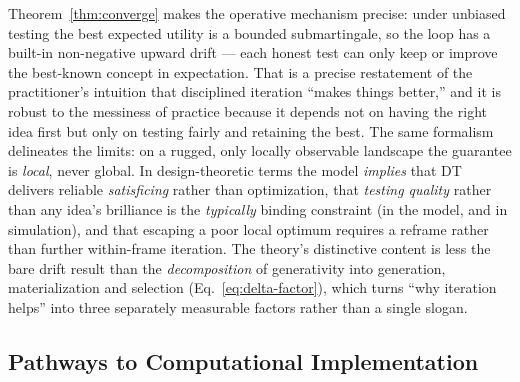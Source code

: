 \documentclass[11pt]{article}
\begin{document}
Theorem~\ref{thm:converge} makes the operative mechanism precise: under unbiased testing the best expected utility is a bounded submartingale, so the loop has a built-in non-negative upward drift --- each honest test can only keep or improve the best-known concept in expectation. That is a precise restatement of the practitioner's intuition that disciplined iteration ``makes things better,'' and it is robust to the messiness of practice because it depends not on having the right idea first but only on testing fairly and retaining the best. The same formalism delineates the limits: on a rugged, only locally observable landscape the guarantee is \emph{local}, never global. In design-theoretic terms the model \emph{implies} that DT delivers reliable \emph{satisficing} rather than optimization, that \emph{testing quality} rather than any idea's brilliance is the \emph{typically} binding constraint (in the model, and in simulation), and that escaping a poor local optimum requires a reframe rather than further within-frame iteration. The theory's distinctive content is less the bare drift result than the \emph{decomposition} of generativity into generation, materialization and selection (Eq.~\eqref{eq:delta-factor}), which turns ``why iteration helps'' into three separately measurable factors rather than a single slogan.

\subsection{Pathways to Computational Implementation}
\label{sec:tools}
\end{document}
